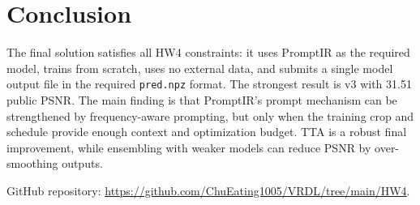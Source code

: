 \documentclass[10pt,twocolumn,letterpaper]{article}
\begin{document}
\section{Conclusion}
The final solution satisfies all HW4 constraints: it uses PromptIR as the required model, trains from scratch, uses no external data, and submits a single model output file in the required \texttt{pred.npz} format. The strongest result is v3 with 31.51 public PSNR. The main finding is that PromptIR's prompt mechanism can be strengthened by frequency-aware prompting, but only when the training crop and schedule provide enough context and optimization budget. TTA is a robust final improvement, while ensembling with weaker models can reduce PSNR by over-smoothing outputs.

GitHub repository: \url{https://github.com/ChuEating1005/VRDL/tree/main/HW4}.

{\small
  
  
}
\end{document}
